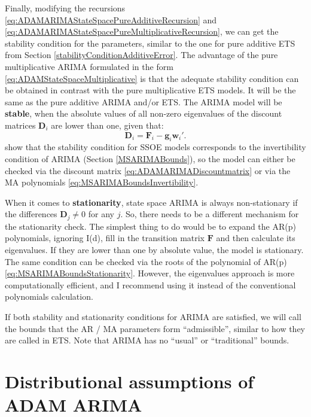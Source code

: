 \documentclass[
]{book}
\theoremstyle{definition}
\theoremstyle{definition}
\theoremstyle{definition}
\theoremstyle{definition}
\theoremstyle{remark}
\begin{document}
Finally, modifying the recursions \eqref{eq:ADAMARIMAStateSpacePureAdditiveRecursion} and \eqref{eq:ADAMARIMAStateSpacePureMultiplicativeRecursion}, we can get the stability condition for the parameters, similar to the one for pure additive ETS from Section \ref{stabilityConditionAdditiveError}. The advantage of the pure multiplicative ARIMA formulated in the form \eqref{eq:ADAMStateSpaceMultiplicative} is that the adequate stability condition can be obtained in contrast with the pure multiplicative ETS models. It will be the same as the pure additive ARIMA and/or ETS. The ARIMA model will be \textbf{stable}, when the absolute values of all non-zero eigenvalues of the discount matrices \(\mathbf{D}_{i}\) are lower than one, given that:
\begin{equation}
  \mathbf{D}_{i} = \mathbf{F}_{i} -\mathbf{g}_{i} \mathbf{w}_{i}' .
  \label{eq:ADAMARIMADiscountmatrix}
\end{equation}
\citet{Hyndman2008b} show that the stability condition for SSOE models corresponds to the invertibility condition of ARIMA (Section \ref{MSARIMABounds}), so the model can either be checked via the discount matrix \eqref{eq:ADAMARIMADiscountmatrix} or via the MA polynomials \eqref{eq:MSARIMABoundsInvertibility}.

When it comes to \textbf{stationarity}, state space ARIMA is always non-stationary if the differences \(\mathbf{D}_j \neq 0\) for any \(j\). So, there needs to be a different mechanism for the stationarity check. The simplest thing to do would be to expand the AR(p) polynomials, ignoring I(d), fill in the transition matrix \(\mathbf{F}\) and then calculate its eigenvalues. If they are lower than one by absolute value, the model is stationary. The same condition can be checked via the roots of the polynomial of AR(p) \eqref{eq:MSARIMABoundsStationarity}. However, the eigenvalues approach is more computationally efficient, and I recommend using it instead of the conventional polynomials calculation.

If both stability and stationarity conditions for ARIMA are satisfied, we will call the bounds that the AR / MA parameters form ``admissible'', similar to how they are called in ETS. Note that ARIMA has no ``usual'' or ``traditional'' bounds.

\hypertarget{ADAMARIMADistributions}{%
\section{Distributional assumptions of ADAM ARIMA}\label{ADAMARIMADistributions}}
\end{document}
